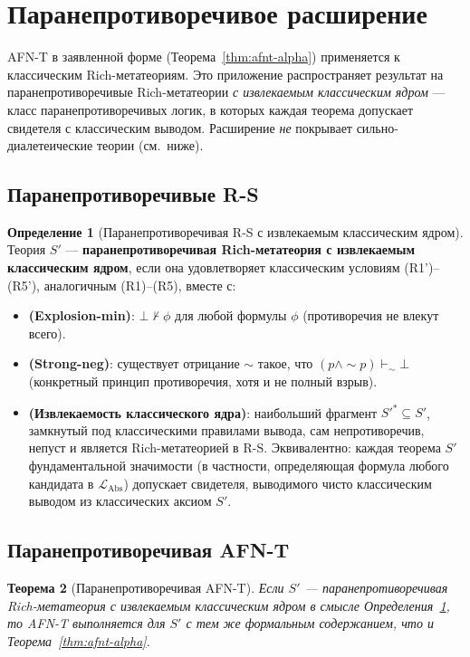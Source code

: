 \documentclass[11pt]{article}
\theoremstyle{plain}
\newtheorem{theorem}{Теорема}[section]
\theoremstyle{definition}
\newtheorem{definition}[theorem]{Определение}
\newcommand{\RS}{\mathrm{R\text{-}S}}
\newcommand{\LAbs}{\mathcal{L}_{\mathrm{Abs}}}
\begin{document}
\section{Паранепротиворечивое расширение}\label{app:paraconsistent}

AFN-T в заявленной форме (Теорема~\ref{thm:afnt-alpha}) применяется к классическим Rich-метатеориям. Это приложение распространяет результат на паранепротиворечивые Rich-метатеории \emph{с извлекаемым классическим ядром} --- класс паранепротиворечивых логик, в которых каждая теорема допускает свидетеля с классическим выводом. Расширение \emph{не} покрывает сильно-диалетеические теории (см.\ ниже).

\subsection{Паранепротиворечивые R-S}

\begin{definition}[Паранепротиворечивая R-S с извлекаемым классическим ядром]\label{def:paraconsistent-rs}
Теория $S'$ — \textbf{паранепротиворечивая Rich-метатеория с извлекаемым классическим ядром}, если она удовлетворяет классическим условиям (R1')--(R5'), аналогичным (R1)--(R5), вместе с:
\begin{itemize}
\item \textbf{(Explosion-min)}: $\bot \not\vdash \phi$ для любой формулы $\phi$ (противоречия не влекут всего).
\item \textbf{(Strong-neg)}: существует отрицание $\sim$ такое, что $(p \wedge \sim p) \vdash_\sim \bot$ (конкретный принцип противоречия, хотя и не полный взрыв).
\item \textbf{(Извлекаемость классического ядра)}: наибольший фрагмент $S'^* \subseteq S'$, замкнутый под классическими правилами вывода, сам непротиворечив, непуст и является Rich-метатеорией в $\RS$. Эквивалентно: каждая теорема $S'$ фундаментальной значимости (в частности, определяющая формула любого кандидата в $\LAbs$) допускает свидетеля, выводимого чисто классическим выводом из классических аксиом $S'$.
\end{itemize}
\end{definition}

\subsection{Паранепротиворечивая AFN-T}

\begin{theorem}[Паранепротиворечивая AFN-T]\label{thm:paraconsistent-afnt}
Если $S'$ — паранепротиворечивая Rich-метатеория с извлекаемым классическим ядром в смысле Определения~\ref{def:paraconsistent-rs}, то AFN-T выполняется для $S'$ с тем же формальным содержанием, что и Теорема~\ref{thm:afnt-alpha}.
\end{theorem}
\end{document}
